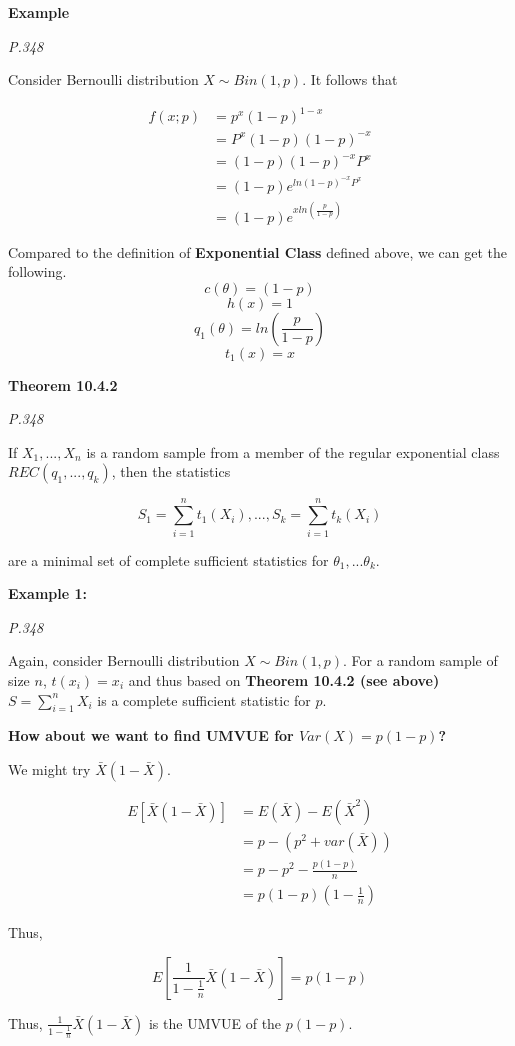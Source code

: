 \documentclass[]{book}
\begin{document}
\textbf{Example}

\emph{P.348}

Consider Bernoulli distribution \(X \sim Bin(1,p)\). It follows that

\[\begin{aligned} f(x; p) &=p^x(1-p)^{1-x} \\ &=P^x(1-p)(1-p)^{-x} \\ &=(1-p)(1-p)^{-x}P^x \\&=(1-p)e^{ln(1-p)^{-x}P^x} \\ &=(1-p)e^{xln(\frac{p}{1-p})} \end{aligned}\]

Compared to the definition of \textbf{Exponential Class} defined above, we can get the following.
\[c(\theta)=(1-p)\]
\[h(x)=1\]
\[q_1(\theta)=ln(\frac{p}{1-p})\]
\[t_1(x)=x\]

\textbf{Theorem 10.4.2}

\emph{P.348}

If \(X_1,...,X_n\) is a random sample from a member of the regular exponential class \(REC(q_1,...,q_k)\), then the statistics

\[S_1=\sum_{i=1}^n t_1(X_i),...,S_k=\sum_{i=1}^n t_k(X_i)\]

are a minimal set of complete sufficient statistics for \(\theta_1,...\theta_k\).

\textbf{Example 1:}

\emph{P.348}

Again, consider Bernoulli distribution \(X \sim Bin(1,p)\). For a random sample of size \(n\), \(t(x_i)=x_i\) and thus based on \textbf{Theorem 10.4.2 (see above)} \(S=\sum_{i=1}^n X_i\) is a complete sufficient statistic for \(p\).

\textbf{How about we want to find UMVUE for \(Var(X)=p(1-p)\)?}

We might try \(\bar{X}(1-\bar{X})\).

\[\begin{aligned} E[\bar{X}(1-\bar{X})] &=E(\bar{X})-E(\bar{X}^2) \\ &=p-(p^2+var(\bar{X})) \\ &=p-p^2-\frac{p(1-p)}{n} \\ &=p(1-p)(1-\frac{1}{n}) \end{aligned}\]

Thus,

\[E[\frac{1}{1-\frac{1}{n}}\bar{X}(1-\bar{X})]=p(1-p)\]

Thus, \(\frac{1}{1-\frac{1}{n}}\bar{X}(1-\bar{X})\) is the UMVUE of the \(p(1-p)\).
\end{document}
